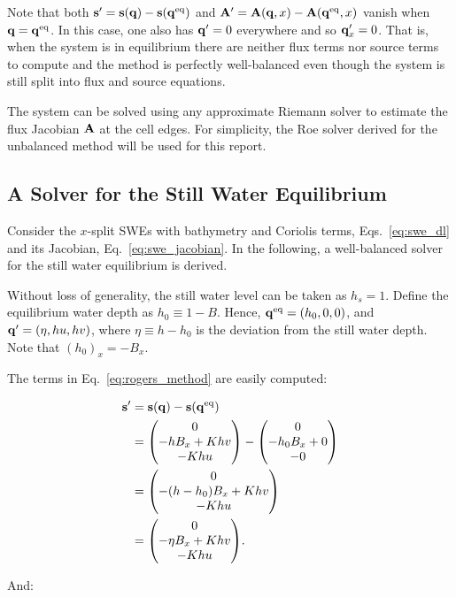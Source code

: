 Note that both $\vb s' = \vb s(\vb q) - \vb s(\vb q^\mathrm{eq})$ and $\vb A' = \vb A(\vb q, x) - \vb A(\vb q^\mathrm{eq}, x)$ vanish when $\vb q = \vb q^\mathrm{eq}$. In this case, one also has $\vb q' = 0$ everywhere and so $\vb q'_x = 0$. That is, when the system is in equilibrium there are neither flux terms nor source terms to compute and the method is perfectly well-balanced even though the system is still split into flux and source equations.

The system can be solved using any approximate Riemann solver to estimate the flux Jacobian $\vb A$ at the cell edges. For simplicity, the Roe solver derived for the unbalanced method will be used for this report.

\subsection{A Solver for the Still Water Equilibrium}
\label{sec:rogers_still}

Consider the $x$-split SWEs with bathymetry and Coriolis terms, Eqs.~\ref{eq:swe_dl} and its Jacobian, Eq.~\ref{eq:swe_jacobian}. In the following, a well-balanced solver for the still water equilibrium is derived.

Without loss of generality, the still water level can be taken as $h_s = 1$. Define the equilibrium water depth as $h_0 \equiv 1 - B$. Hence, $\vb q^\mathrm{eq} = (h_0, 0, 0)$, and $\vb q' = (\eta, hu, hv)$, where $\eta \equiv h - h_0$ is the deviation from the still water depth. Note that $(h_0)_x = - B_x$.

The terms in Eq.~\ref{eq:rogers_method} are easily computed:

\begin{align}
  \vb s' &= \vb s(\vb q) - \vb s(\eq{\vb q}) \\
  &= \mqty(0 \\ -h B_x + K h v \\ - K h u) - \mqty(0 \\ -h_0 B_x + 0 \\ - 0) \\
  &= \mqty(0 \\ -(h-h_0) B_x + K h v \\ - K h u) \\
  &= \mqty(0 \\ -\eta B_x + K h v \\ - K h u).
\end{align}

And:

